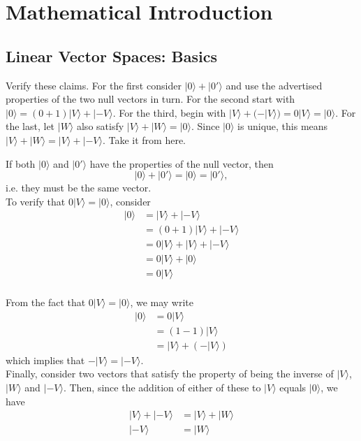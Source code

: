 \documentclass[../principles-of-quantum-mechanics.tex]{subfiles}
\begin{document}
\printanswers

\section{Mathematical Introduction}

\subsection{Linear Vector Spaces: Basics}

\begin{questions}

\question Verify these claims. For the first consider $|0\rangle + |0'\rangle$
and use the advertised properties of the two null vectors in turn. For the
second start with $|0\rangle = (0 + 1)|V\rangle + |{-V}\rangle$. For the third,
begin with $|V\rangle + (-|V\rangle)=0|V\rangle=|0\rangle$. For the last, let
$|W\rangle$ also satisfy $|V\rangle+|W\rangle=|0\rangle$. Since $|0\rangle$ is
unique, this means $|V\rangle+|W\rangle=|V\rangle + |{-V}\rangle$. Take it from
here.

\begin{solution}
	If both $|0\rangle$ and $|0'\rangle$ have the properties of the null vector, then
	\[
		|0\rangle + |0'\rangle = |0\rangle = |0'\rangle,
	\]
	i.e. they must be the same vector. \\
	
	To verify that $0|V\rangle = |0\rangle$, consider
	\begin{align*}
		|0\rangle &= |V\rangle + |{-V}\rangle \\
		&= (0 + 1)|V\rangle + |{-V}\rangle \\
		&= 0|V\rangle + |V\rangle + |{-V}\rangle \\
		&= 0|V\rangle + |0\rangle \\
		&= 0|V\rangle
	\end{align*} \\
	
	From the fact that $0|V\rangle = |0\rangle$, we may write
	\begin{align*}
		|0\rangle &= 0|V\rangle \\
		&= (1 - 1)|V\rangle \\
		&= |V\rangle + (-|V\rangle)
	\end{align*}
	which implies that $-|V\rangle = |{-V}\rangle$. \\
	
	Finally, consider two vectors that satisfy the property of being the inverse of $|V\rangle$, $|W\rangle$ and $|{-V}\rangle$. Then, since the addition of either of these to $|V\rangle$ equals $|0\rangle$, we have
	\begin{align*}
		|V\rangle + |{-V}\rangle &= |V\rangle + |W\rangle \\
		|{-V}\rangle &= |W\rangle
	\end{align*}
\end{solution}


\end{questions}
\end{document}
